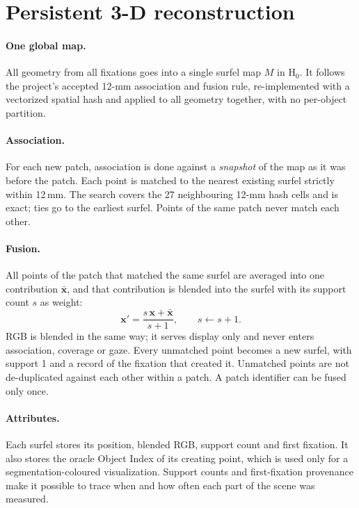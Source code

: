 \documentclass[11pt,a4paper]{article}
\newcommand{\Hz}{\ensuremath{\mathrm{H}_0}}
\begin{document}
\section{Persistent 3-D reconstruction}\label{sec:map}

\paragraph{One global map.} All geometry from all fixations goes into a single surfel map $M$ in \Hz{}. It follows the
project's accepted 12-mm association and fusion rule, re-implemented with a vectorized spatial hash and applied to all
geometry together, with no per-object partition.

\paragraph{Association.} For each new patch, association is done against a \emph{snapshot} of the map as it was before
the patch. Each point is matched to the nearest existing surfel strictly within 12\,mm. The search covers the 27
neighbouring 12-mm hash cells and is exact; ties go to the earliest surfel. Points of the same patch never match each
other.

\paragraph{Fusion.} All points of the patch that matched the same surfel are averaged into one contribution
$\bar{\mathbf{x}}$, and that contribution is blended into the surfel with its support count $s$ as weight:
\begin{equation}
  \mathbf{x}' = \frac{s\,\mathbf{x} + \bar{\mathbf{x}}}{s + 1}, \qquad s \leftarrow s + 1 .
  \label{eq:fusion}
\end{equation}
RGB is blended in the same way; it serves display only and never enters association, coverage or gaze. Every
unmatched point becomes a new surfel, with support 1 and a record of the fixation that created it. Unmatched points
are not de-duplicated against each other within a patch. A patch identifier can be fused only once.

\paragraph{Attributes.} Each surfel stores its position, blended RGB, support count and first fixation. It also
stores the oracle Object Index of its creating point, which is used only for a segmentation-coloured visualization.
Support counts and first-fixation provenance make it possible to trace when and how often each part of the scene was
measured.
\end{document}

